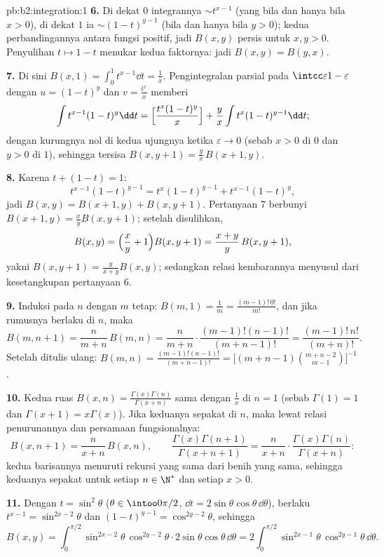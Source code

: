 \begin{solution}{pb:b2:integration:1}
\textbf{6.} Di dekat $0$ integrannya $\sim t^{x-1}$
(yang  bila dan hanya bila $x > 0$), di dekat $1$ ia $\sim
(1-t)^{y-1}$ (bila dan hanya bila $y > 0$); kedua perbandingannya antara
fungsi positif, jadi $B(x,y)$  persis untuk $x, y > 0$.
Penyulihan $t \mapsto 1 - t$ menukar kedua faktornya: jadi $B(x,y) = B(y,x)$.

\textbf{7.} Di sini $B(x,1) = \int_0^1 t^{x-1}\dd t = \frac1x$.
Pengintegralan parsial pada $\intcc\varepsilon{1-\varepsilon}$ dengan $u
= (1-t)^y$ dan $v = \frac{t^x}{x}$ memberi
\[
\int t^{x-1}(1-t)^{y}\dd t
= \Bigl[\frac{t^x(1-t)^y}{x}\Bigr]
+ \frac{y}{x}\int t^{x}(1-t)^{y-1}\dd t ;
\]
dengan kurungnya nol di kedua ujungnya ketika $\varepsilon \to 0$ (sebab
$x > 0$ di $0$ dan $y > 0$ di $1$), sehingga tersisa $B(x, y+1) = \frac
yx\,B(x+1, y)$.

\textbf{8.} Karena $t + (1-t) = 1$:
\[
t^{x-1}(1-t)^{y-1} = t^{x}(1-t)^{y-1} + t^{x-1}(1-t)^{y},
\]
jadi $B(x,y) = B(x+1,y) + B(x,y+1)$. Pertanyaan 7 berbunyi $B(x+1,y) =
\frac xy B(x,y+1)$; setelah disulihkan,
\[
B(x,y) = \Bigl(\frac xy + 1\Bigr)B(x,y+1)
= \frac{x+y}{y}\,B(x,y+1),
\]
yakni $B(x,y+1) = \frac{y}{x+y}B(x,y)$; sedangkan relasi kembarannya
menyusul dari kesetangkupan pertanyaan 6.

\textbf{9.} Induksi pada $n$ dengan $m$ tetap: $B(m,1) = \frac1m =
\frac{(m-1)!\,0!}{m!}$, dan jika rumusnya berlaku di $n$, maka
\[
B(m, n+1) = \frac{n}{m+n}\,B(m,n)
= \frac{n}{m+n}\cdot\frac{(m-1)!(n-1)!}{(m+n-1)!}
= \frac{(m-1)!\,n!}{(m+n)!} .
\]
Setelah ditulis ulang: $B(m,n) = \frac{(m-1)!(n-1)!}{(m+n-1)!} =
\bigl[(m+n-1)\binom{m+n-2}{m-1}\bigr]^{-1}$.

\textbf{10.} Kedua ruas $B(x,n) =
\frac{\Gamma(x)\Gamma(n)}{\Gamma(x+n)}$ sama dengan $\frac1x$ di $n =
1$ (sebab $\Gamma(1) = 1$ dan $\Gamma(x+1) = x\Gamma(x)$). Jika keduanya
sepakat di $n$, maka lewat relasi penurunannya dan persamaan
fungsionalnya:
\[
B(x, n+1) = \frac{n}{x+n}\,B(x,n), \qquad
\frac{\Gamma(x)\Gamma(n+1)}{\Gamma(x+n+1)}
= \frac{n}{x+n}\cdot
\frac{\Gamma(x)\Gamma(n)}{\Gamma(x+n)} :
\]
kedua barisannya menuruti rekursi yang sama dari benih yang sama,
sehingga keduanya sepakat untuk setiap $n \in \N^*$ dan setiap $x > 0$.

\textbf{11.} Dengan $t = \sin^2\theta$ ($\theta \in
\intoo0{\pi/2}$, $\dd t = 2\sin\theta\cos\theta\,\dd\theta$), berlaku
$t^{x-1} = \sin^{2x-2}\theta$ dan $(1-t)^{y-1} =
\cos^{2y-2}\theta$, sehingga
\[
B(x,y) = \int_0^{\pi/2}\sin^{2x-2}\theta\,\cos^{2y-2}\theta
\cdot 2\sin\theta\cos\theta\,\dd\theta
= 2\int_0^{\pi/2}\sin^{2x-1}\theta\,\cos^{2y-1}\theta\,
\dd\theta .
\]


\end{solution}
